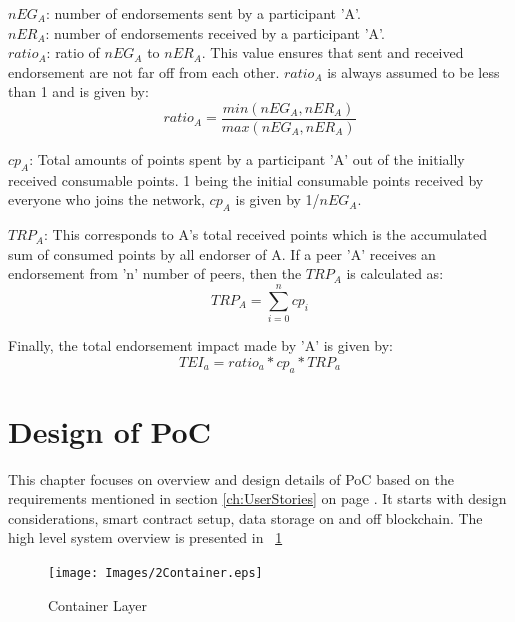 \textit{$nEG_A$}: number of endorsements sent by a participant 'A'. \\

\textit{$nER_A$}: number of endorsements received by a participant 'A'. \\

\textit{$ratio_A$}: ratio of \textit{$nEG_A$} to \textit{$nER_A$}. This value
ensures that sent and received endorsement are not far off from  each other.
\textit{$ratio_A$} is always assumed to be less than 1 and is given by: 
\begin{equation}
	ratio_A = \frac{min(nEG_A,nER_A)}{max(nEG_A,nER_A)} 
\end{equation}

\textit{$cp_A$}: Total amounts of points spent by a participant 'A' out of the
initially received consumable points. 1 being the initial consumable points
received by everyone who joins the network, \textit{$cp_A$} is given by
1/\textit{$nEG_A$}.

\textit{$TRP_A$}: This corresponds to A's total received points which is the
accumulated sum of consumed points by all endorser of A.  If a peer 'A'
receives an endorsement from 'n' number of peers, then the \textit{$TRP_A$} is
calculated as:
\begin{equation}
	TRP_A  = \sum_{i=0}^{n}cp_{i}
\end{equation}

Finally, the total endorsement impact made by 'A' is given by: \\
\begin{equation}
	TEI_a = ratio_a * cp_a * TRP_a
\end{equation}

%

\section{Design of PoC}
This chapter focuses on overview and design details of PoC based on the
requirements mentioned in section \ref{ch:UserStories} on page
\pageref{ch:UserStories}. It starts with design considerations, smart contract
setup, data storage on and off blockchain. The high level system overview is
presented in ~\ref{fig:SystemContainer} 

\begin{figure}
	\centering
	\texttt{[image: Images/2Container.eps]}
	\caption{Container Layer}
	\label{fig:SystemContainer}
\end{figure}

